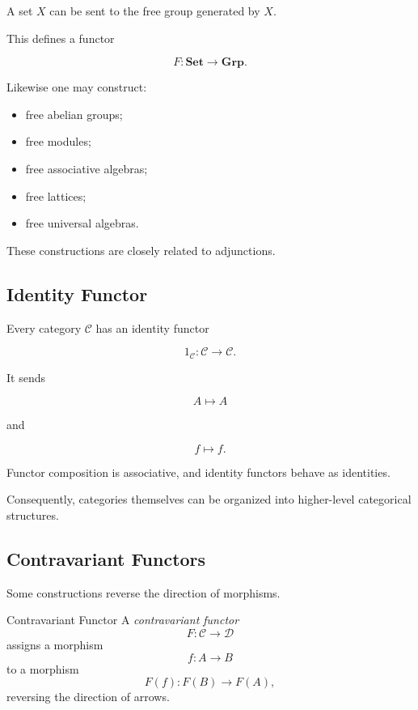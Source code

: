 A set \(X\) can be sent to the free group generated by \(X\).

This defines a functor

\[ F:\mathbf{Set}\to\mathbf{Grp}. \]

Likewise one may construct:

\begin{itemize}
    \item free abelian groups;
    \item free modules;
    \item free associative algebras;
    \item free lattices;
    \item free universal algebras.
\end{itemize}

These constructions are closely related to adjunctions.

\subsection{Identity Functor}
\label{subsec:identity-functor}

Every category \(\mathcal C\) has an identity functor

\[ 1_{\mathcal C}:\mathcal C\to\mathcal C. \]

It sends

\[ A\mapsto A \]

and

\[ f\mapsto f. \]

Functor composition is associative, and identity functors behave as
identities.

Consequently, categories themselves can be organized into higher-level
categorical structures.

\subsection{Contravariant Functors}
\label{subsec:contravariant-functors}

Some constructions reverse the direction of morphisms.

\begin{definitionbox}{Contravariant Functor}
A \emph{contravariant functor}
\[ F:\mathcal C\to\mathcal D \]
assigns a morphism
\[ f:A\to B \]
to a morphism
\[ F(f):F(B)\to F(A), \]
reversing the direction of arrows.
\end{definitionbox}

